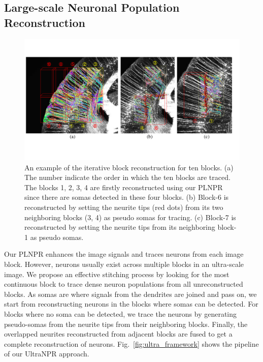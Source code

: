 \subsection{Large-scale Neuronal Population Reconstruction}
\label{sec:UltraNPR}

\begin{figure}[t]
	\centering
	\includegraphics[width=1\columnwidth]{./Illustrations/ultranpr_block_search.pdf}
	\caption{An example of the iterative block reconstruction for ten blocks. (a) The number indicate the order in which the ten blocks are traced. The blocks 1, 2, 3, 4 are firstly reconstructed using our PLNPR since there are somas detected in these four blocks. (b) Block-6 is reconstructed by setting the neurite tips (red dots) from its two neighboring blocks (3, 4) as pseudo somas for tracing. (c) Block-7 is reconstructed by setting the neurite tips from its neighboring block-1 as pseudo somas.}
	\label{fig:blocksearch}
\end{figure}


Our PLNPR enhances the image signals and traces neurons from each image block.
However, neurons usually exist across multiple blocks in an ultra-scale image. 
% 
We propose an effective stitching process by looking for the most continuous block to trace dense neuron populations from all unreconstructed blocks. 
%
As somas are where signals from the dendrites are joined and pass on, we start from reconstructing neurons in the blocks where somas can be detected.
For blocks where no soma can be detected, we trace the neurons by generating pseudo-somas from the neurite tips from their neighboring blocks. 
%
Finally, the overlapped neurites reconstructed from adjacent blocks are fused to get a complete reconstruction of neurons. 
Fig.~\ref{fig:ultra_framework} shows the pipeline of our UltraNPR approach. 

